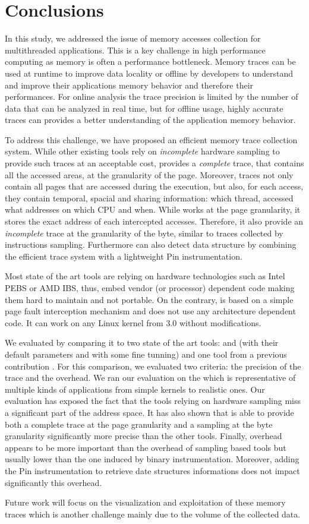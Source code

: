 \section{Conclusions}
\label{sec:cncl}

In this study, we addressed the issue of memory accesses collection for
multithreaded applications. This is a key challenge in high performance
computing as memory is often a performance
bottleneck. Memory traces can be used at runtime to improve data locality or
offline by developers to understand and improve their applications memory
behavior and therefore their performances. For online analysis the trace precision
is limited by the number of data that can be analyzed in real time, but for
offline usage, highly accurate traces can provides a better understanding of
the application memory behavior.

To address this challenge, we have proposed \Moca an efficient memory trace
collection system. While other existing tools
rely on \emph{incomplete} hardware sampling to
provide such traces at an acceptable cost, \Moca provides a \emph{complete}
trace, that contains all the accessed areas, at the granularity of the page.
Moreover, \Moca traces not only
contain all pages that are accessed during the execution, but also, 
for each access, they contain temporal, spacial and sharing
information: which thread, accessed what addresses on which CPU and when.
While \Moca works at the page granularity, it stores the exact
address of each intercepted accesses. Therefore, it also provide an
\emph{incomplete} trace at the granularity of the byte, similar to
traces collected by instructions sampling. Furthermore \Moca can also detect
data structure by combining the efficient trace system with a lightweight Pin
instrumentation.

Most state of the art tools are relying on hardware technologies such as Intel PEBS
or AMD IBS, thus, embed vendor (or processor) dependent code making them hard
to maintain and not portable. On the contrary, \Moca is based on a simple page
fault interception mechanism and does not use any architecture dependent code.
It can work on any Linux kernel from $3.0$ without modifications.

We evaluated \Moca by comparing it to two state of the art tools: \Mitos and
\MemProf (with their default parameters and with some fine tunning) and one
tool from a previous contribution \TABARNAC. For this comparison, we evaluated
two criteria: the precision of the trace and the overhead. We ran our
evaluation on the \NPB which is representative of multiple kinds of applications from simple kernels
to realistic ones. Our evaluation has exposed the fact that the tools
relying on hardware sampling miss a significant part of the address space. It
has also shown that \Moca is able to provide both a complete trace at the page
granularity and a sampling at the byte granularity significantly more precise than the
other tools. Finally, \Moca overhead appears to be more important than the overhead of sampling
based tools but usually lower than the one induced by binary instrumentation.
Moreover, adding the Pin instrumentation to retrieve date structures
informations does not impact significantly this overhead.

Future work will focus on the visualization and exploitation of these memory traces
which is another challenge mainly due to the volume of the collected data.
